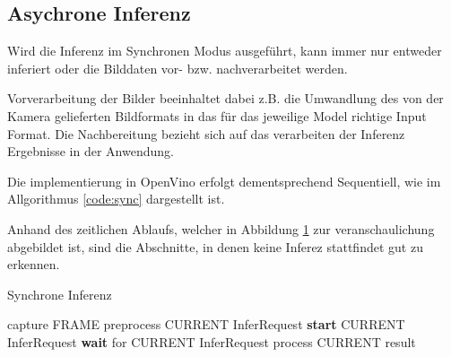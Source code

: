 \subsection{Asychrone Inferenz}

Wird die Inferenz im Synchronen Modus ausgeführt, kann immer
nur entweder inferiert oder 
die Bilddaten vor- bzw. nachverarbeitet werden.

Vorverarbeitung der Bilder beeinhaltet dabei 
z.B. die Umwandlung des von der Kamera gelieferten 
Bildformats in das für das jeweilige Model richtige 
Input Format.
Die Nachbereitung bezieht sich auf das verarbeiten 
der Inferenz Ergebnisse in der Anwendung.


Die implementierung in OpenVino 
erfolgt dementsprechend Sequentiell, wie 
im Allgorithmus \ref{code:sync} dargestellt ist.


Anhand des zeitlichen Ablaufs, welcher in Abbildung \ref{fig:sync}
zur veranschaulichung abgebildet ist, sind die Abschnitte, 
in denen keine Inferez stattfindet gut zu erkennen.


\vspace{1cm}
\begin{minipage}{0.1\textwidth}
  \hfill
\end{minipage}
\begin{minipage}{0.5\textwidth}
  \begin{algorithm}[H]
    \caption{Synchrone Inferenz}
    \label{code:sync}
    \begin{algorithmic}
    \WHILE{\TRUE}
        \STATE capture FRAME
        \STATE preprocess CURRENT InferRequest
        \STATE \textbf{start} CURRENT InferRequest
        \STATE \textbf{wait} for CURRENT InferRequest
        \STATE process CURRENT result
    \ENDWHILE
    \end{algorithmic}
  \end{algorithm}  
\end{minipage}
\begin{minipage}{0.4\textwidth}
  \centering
  \vspace{1cm}
  \def\svgwidth{0.5\textwidth}
  
\end{minipage}

\vspace{1cm}
\begin{figure}[H]
  \centering
  \def\svgwidth{0.9\textwidth}
  
  \caption{}
  \label{fig:sync}
\end{figure}


